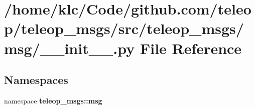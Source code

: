 \section{/home/klc/Code/github.com/teleop/teleop\_\-msgs/src/teleop\_\-msgs/msg/\_\-\_\-init\_\-\_\-.py File Reference}
\label{msg_2____init_____8py}
\subsection*{Namespaces}
\begin{DoxyCompactItemize}
\item 
namespace {\bf teleop\_\-msgs::msg}
\end{DoxyCompactItemize}
